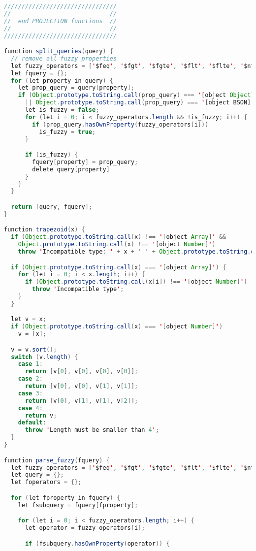 \begin{lstlisting}[language=java, escapechar=|]
////////////////////////////////
//                            //
//  end PROJECTION functions  //
//                            //
////////////////////////////////

function split_queries(query) {
  // remove all fuzzy properties
  let fuzzy_operators = ['$feq', '$fgt', '$fgte', '$flt', '$flte', '$nfeq', '$nfgt', '$nfgte', '$nflt', '$nflte'];
  let fquery = {};
  for (let property in query) {
    let prop_query = query[property];
    if (Object.prototype.toString.call(prop_query) === '[object Object]'
      || Object.prototype.toString.call(prop_query) === '[object BSON]') {
      let is_fuzzy = false;
      for (let i = 0; i < fuzzy_operators.length && !is_fuzzy; i++) {
        if (prop_query.hasOwnProperty(fuzzy_operators[i]))
          is_fuzzy = true;
      }

      if (is_fuzzy) {
        fquery[property] = prop_query;
        delete query[property]
      }
    }
  }

  return [query, fquery];
}

function trapezoid(x) {
  if (Object.prototype.toString.call(x) !== '[object Array]' &&
    Object.prototype.toString.call(x) !== '[object Number]')
    throw 'Incompatible type: ' + x + ' ' + Object.prototype.toString.call(x);

  if (Object.prototype.toString.call(x) === '[object Array]') {
    for (let i = 0; i < x.length; i++) {
      if (Object.prototype.toString.call(x[i]) !== '[object Number]')
        throw 'Incompatible type';
    }
  }

  let v = x;
  if (Object.prototype.toString.call(x) === '[object Number]')
    v = [x];

  v = v.sort();
  switch (v.length) {
    case 1:
      return [v[0], v[0], v[0], v[0]];
    case 2:
      return [v[0], v[0], v[1], v[1]];
    case 3:
      return [v[0], v[1], v[1], v[2]];
    case 4:
      return v;
    default:
      throw 'Length must be smaller than 4';
  }
}

function parse_fuzzy(fquery) {
  let fuzzy_operators = ['$feq', '$fgt', '$fgte', '$flt', '$flte', '$nfeq', '$nfgt', '$nfgte', '$nflt', '$nflte'];
  let query = {};
  let foperators = {};

  for (let fproperty in fquery) {
    let fsubquery = fquery[fproperty];

    for (let i = 0; i < fuzzy_operators.length; i++) {
      let operator = fuzzy_operators[i];

      if (fsubquery.hasOwnProperty(operator)) {


\end{lstlisting}
